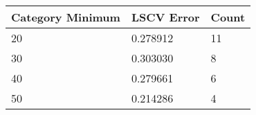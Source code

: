 \begin{tabular}{p{2cm}|p{1.7cm}|p{1.4cm}}
\toprule
 Category Minimum &    LSCV Error  &  Count \\
\midrule
               20 & 0.278912 &     11 \\
               30 & 0.303030 &      8 \\
               40 & 0.279661 &       6 \\
               50 & 0.214286  &      4 \\
\bottomrule
\end{tabular}
